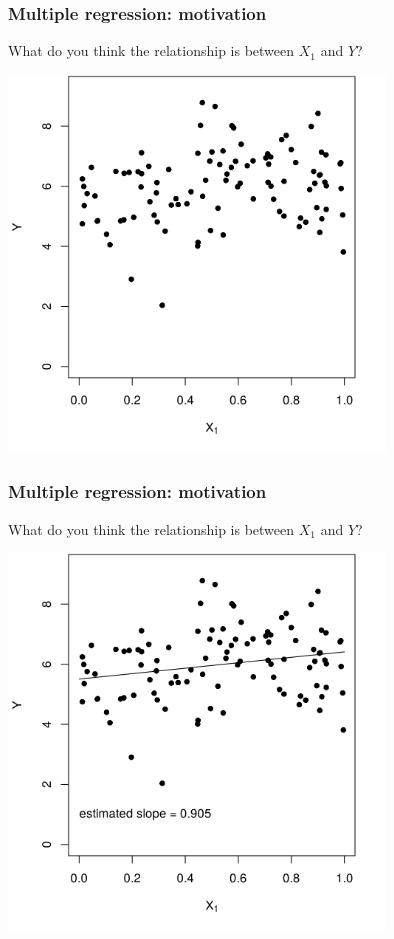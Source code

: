 \documentclass[12pt, 
hyperref={colorlinks=true, linkcolor=blue, urlcolor=cyan},dvipsnames]{beamer}
\begin{document}
\begin{frame}
\frametitle{Multiple regression: motivation}
What do you think the relationship is between $X_1$ and $Y$?

\vspace{-0.3cm}
\centering
\includegraphics[width = 0.75\textwidth]{./plots/confounding_simple.png}
\end{frame}

\begin{frame}
\frametitle{Multiple regression: motivation}
What do you think the relationship is between $X_1$ and $Y$?

\vspace{-0.3cm}

\centering
\includegraphics[width = 0.75\textwidth]{./plots/confounding_simple_with_line.png}
\end{frame}
\end{document}
